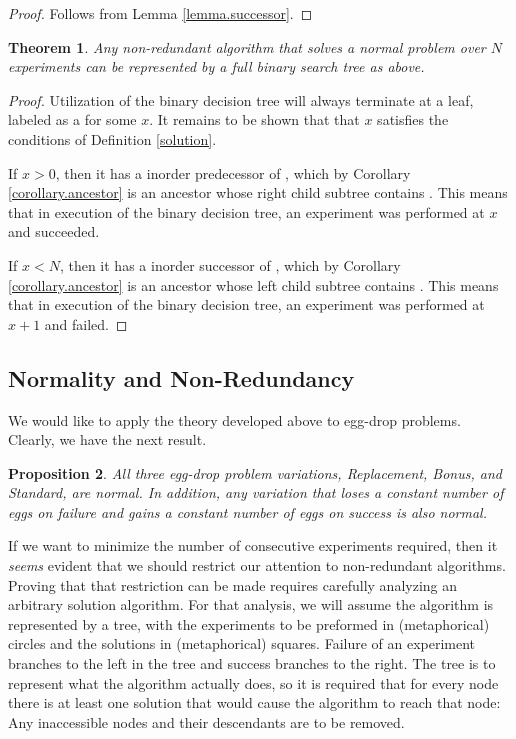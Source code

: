 \documentclass[12pt]{amsart}
\newtheorem{theorem}{Theorem}[section]
\newtheorem{proposition}[theorem]{Proposition}
\theoremstyle{definition}
\theoremstyle{theorem}
\newcommand*\circled[1]{\tikz[baseline=(char.base)]{            \node[circle,draw,inner sep=2pt] (char) {#1};}}
\newcommand*\ellipsed[1]{\tikz[baseline=(char.base)]{           \mynode[inner xsep=-2pt]{A}{(0,0)}{#1};}}
\begin{document}
\begin{proof}
	Follows from Lemma \ref{lemma.successor}.
\end{proof}

\begin{theorem}\label{the-tree-result}
Any non-redundant   algorithm that solves a normal problem over $N$ experiments 
can be  represented by a full binary search tree as above.
\end{theorem}

\begin{proof}
Utilization of the binary decision tree will always terminate at a leaf, labeled as a  for some $x$. 
It remains to be shown that that $x$ satisfies the conditions of  Definition \ref{solution}. 


If $x>0$, then it has a inorder predecessor of \circled{$x$}, which by Corollary \ref{corollary.ancestor} is an ancestor whose right child subtree contains . This means that in execution of the binary decision tree, an experiment was performed at $x$ and succeeded. 

If $x<N$, then it has a inorder successor of \ellipsed{$x\mathsmaller{+1}$}, which by Corollary \ref{corollary.ancestor} is an ancestor whose left child subtree contains . This means that in execution of the binary decision tree, an experiment was performed at $x+1$ and failed.
\end{proof}

\subsection{Normality and Non-Redundancy}

We would like to apply the theory developed above to egg-drop problems.
Clearly, we have the next result.

\begin{proposition}\label{prop.normal}
All three egg-drop problem variations, Replacement, Bonus, and Standard, are normal.	
In addition, any variation that loses a constant number of eggs on failure and gains a 
constant number of eggs on success is also normal.
\end{proposition}

If we want to  minimize the number of consecutive experiments required, 
then it {\it seems} evident that we should restrict our attention to non-redundant algorithms.
Proving that that restriction can be made requires carefully
analyzing an arbitrary solution algorithm.
For that analysis, we will assume the algorithm is  represented  by a tree,
with the experiments to be preformed in (metaphorical) circles and the solutions
in (metaphorical) squares. Failure of an experiment branches to the left in the tree
and success branches to the right. 
The tree is to represent what the algorithm 
actually does,  so it is 
required that for every node there is at least one  solution that would cause
the algorithm to reach that node: 
Any inaccessible nodes and their descendants
are to be removed.
\end{document}
